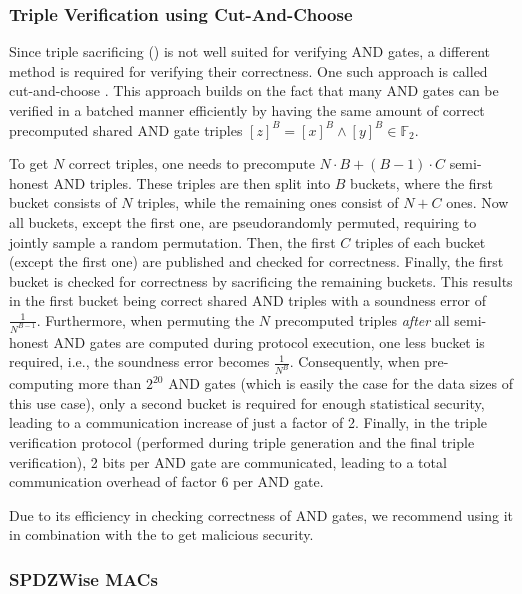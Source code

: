 \documentclass[a4paper,11pt,
]{article}
\newcommand{\F}{\ensuremath{\mathbb{F}}\xspace}
\newcommand{\sharedB}[1]{\ensuremath{[{#1}]^B}}
\begin{document}
\subsubsection{Triple Verification using Cut-And-Choose} \label{sec::cutandchoose}

Since triple sacrificing () is not well suited for verifying AND gates, a different method is required for verifying their correctness. One such approach is called cut-and-choose \cite{DBLP:conf/sp/ArakiBFLLNOWW17}. This approach builds on the fact that many AND gates can be verified in a batched manner efficiently by having the same amount of correct precomputed shared AND gate triples $\sharedB{z} = \sharedB{x} \wedge \sharedB{y} \in \F_2$.

To get $N$ correct triples, one needs to precompute $N\cdot B + (B-1)\cdot C$ semi-honest AND triples. These triples are then split into $B$ buckets, where the first bucket consists of $N$ triples, while the remaining ones consist of $N+C$ ones. Now all buckets, except the first one, are pseudorandomly permuted, requiring to jointly sample a random permutation. Then, the first $C$ triples of each bucket (except the first one) are published and checked for correctness. Finally, the first bucket is checked for correctness by sacrificing the remaining buckets. This results in the first bucket being correct shared AND triples with a soundness error of $\frac{1}{N^{B-1}}$. Furthermore, when permuting the $N$ precomputed triples \textit{after} all semi-honest AND gates are computed during protocol execution, one less bucket is required, i.e., the soundness error becomes $\frac{1}{N^B}$. Consequently, when pre-computing more than $2^{20}$ AND gates (which is easily the case for the data sizes of this use case), only a second bucket is required for enough statistical security, leading to a communication increase of just a factor of 2. Finally, in the triple verification protocol (performed during triple generation and the final triple verification), 2 bits per AND gate are communicated, leading to a total communication overhead of factor 6 per AND gate.

Due to its efficiency in checking correctness of AND gates, we recommend using it in combination with the  to get malicious security.

\subsubsection{SPDZWise MACs} \label{sec::spdzwise}
\end{document}
